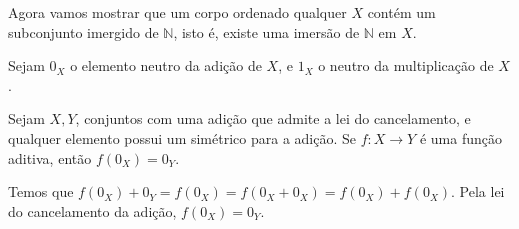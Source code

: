 \documentclass[../main.tex]{subfiles}
\begin{document}
Agora vamos mostrar que um corpo ordenado qualquer $X$ contém um subconjunto imergido de $\mathbb{N}$, isto é, existe uma imersão de $\mathbb{N}$ em $X$.

Sejam $0_X$ o elemento neutro da adição de $X$, e $1_X$ o neutro da multiplicação de $X$.

\begin{lema}\label{enum-lema-preservaZero}
    Sejam $X,Y$, conjuntos com uma adição que admite a lei do cancelamento, e qualquer elemento possui um simétrico para a adição. 
    Se $f \colon X \to Y$ é uma função aditiva, então $f(0_X)=0_Y$.
\end{lema}
\begin{dem}
    Temos que $f(0_X) + 0_Y = f(0_X) = f(0_X + 0_X) = f(0_X) + f(0_X)$. Pela lei do cancelamento da adição, $f(0_X) = 0_Y$. 
\end{dem}
\end{document}
